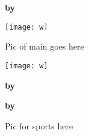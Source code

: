 \documentclass{article}
\date{January 2020}
\begin{document}
\maketitle
\large 


\textbf{by}





\begin{multicols}{2}

\texttt{[image: w]}

Pic of main goes here

\texttt{[image: w]}


\textbf{by}





\end{multicols}
\pagebreak 



\textbf{by}



\closearticle

\begin{multicols}{2}





\begin{center}
    Pic for sports here
\end{center}






\end{multicols}

\closearticle

\pagebreak



\begin{multicols}{2}





\end{multicols}
\closearticle
\end{document}
